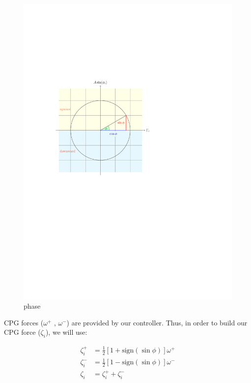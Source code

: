 \documentclass{article}
\begin{document}
\begin{figure}[thpb]
	\centering
		\centering
		\includegraphics[scale = 0.7]{phase_plot_cropped.pdf}
		\centering
		\caption{phase}
		\label{fig:phase_plot}
\end{figure}

CPG forces ($\omega^+$ , $\omega^-$) are provided by our controller. Thus, in order to build our CPG force ($\zeta_i$), we will use: 

\begin{align}\label{eq:spliting}
	\zeta_i^+ &= \frac{1}{2}[1+ \mathrm{sign}(\sin\phi)] \omega^+\\
	\zeta_i^- &= \frac{1}{2}[1- \mathrm{sign}(\sin\phi)] \omega^-\\
	\zeta_i &= \zeta_i^+ + \zeta_i^-
\end{align}
\end{document}
